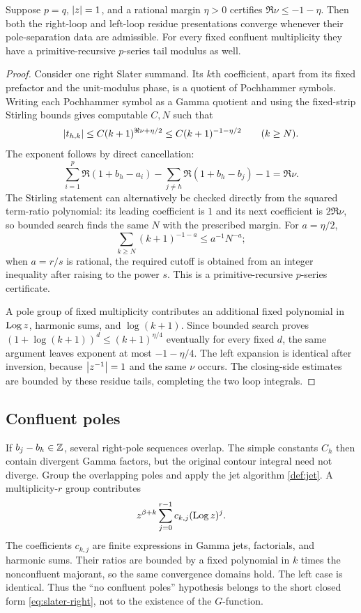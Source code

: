 \begin{theorem}\label{thm:balanced-unit-circle}
Suppose $p=q$, $\left|z\right|=1$, and a rational margin $\eta>0$ certifies
$\Re\nu\le-1-\eta$.  Then both the right-loop and left-loop residue
presentations converge whenever their pole-separation data are admissible.
For every fixed confluent multiplicity they have a primitive-recursive
$p$-series tail modulus as well.
\end{theorem}
\begin{proof}
Consider one right Slater summand.  Its $k$th coefficient, apart from its fixed
prefactor and the unit-modulus phase, is a quotient of Pochhammer symbols.
Writing each Pochhammer symbol as a Gamma quotient and using the fixed-strip
Stirling bounds gives computable $C,N$ such that
\begin{equation}\label{eq:unit-circle-coeff}
 \left|t_{h,k}\right|\le C(k+1)^{\Re\nu+\eta/2}
 \le C(k+1)^{-1-\eta/2}\qquad(k\ge N).
\end{equation}
The exponent follows by direct cancellation:
\[
 \sum_{i=1}^{p}\Re(1+b_h-a_i)
 -\sum_{j\ne h}\Re(1+b_h-b_j)-1=\Re\nu.
\]
The Stirling statement can alternatively be checked directly from the squared
term-ratio polynomial: its leading coefficient is $1$ and its next coefficient
is $2\Re\nu$, so bounded search finds the same $N$ with the prescribed margin.
For $a=\eta/2$,
\[
 \sum_{k\ge N}(k+1)^{-1-a}\le a^{-1}N^{-a};
\]
when $a=r/s$ is rational, the required cutoff is obtained from an integer
inequality after raising to the power $s$.  This is a primitive-recursive
$p$-series certificate.

A pole group of fixed multiplicity contributes an additional fixed polynomial
in $\operatorname{Log} z$, harmonic sums, and $\log(k+1)$.  Since bounded search proves
$(1+\log(k+1))^d\le(k+1)^{\eta/4}$ eventually for every fixed $d$, the same
argument leaves exponent at most $-1-\eta/4$.  The left expansion is identical
after inversion, because $\left|z^{-1}\right|=1$ and the same $\nu$ occurs.  The
closing-side estimates are bounded by these residue tails, completing the two
loop integrals.
\end{proof}

\subsection{Confluent poles}

If $b_j-b_h\in\mathbb Z$, several right-pole sequences overlap.  The simple constants
$C_h$ then contain divergent Gamma factors, but the original contour integral
need not diverge.  Group the overlapping poles and apply the jet algorithm
\cref{def:jet}.  A multiplicity-$r$ group contributes
\begin{equation}\label{eq:power-log-normal}
 z^{\beta+k}\sum_{j=0}^{r-1}c_{k,j}(\operatorname{Log} z)^j.
\end{equation}
The coefficients $c_{k,j}$ are finite expressions in Gamma jets, factorials,
and harmonic sums.  Their ratios are bounded by a fixed polynomial in $k$
times the nonconfluent majorant, so the same convergence domains hold.  The
left case is identical.  Thus the ``no confluent poles'' hypothesis belongs to
the short closed form \eqref{eq:slater-right}, not to the existence of the
$G$-function.


